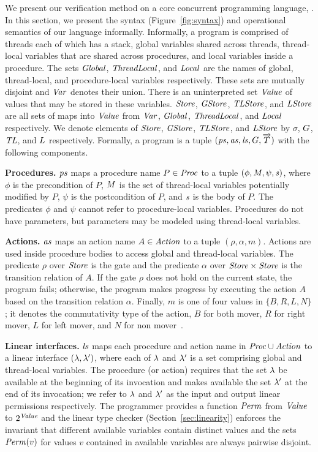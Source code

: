 We present our verification method on a core concurrent programming language, \civl.
In this section, we present the syntax (Figure~\ref{fig:syntax}) and operational semantics of our language informally.
Informally, a \civl program is comprised of threads each of which has a stack, global variables shared across threads, 
thread-local variables that are shared across procedures, and local variables inside a procedure.
The sets $\mathit{Global}$, $\mathit{ThreadLocal}$, and $\mathit{Local}$ are the names of global, thread-local, and procedure-local variables 
respectively.
These sets are mutually disjoint and $\mathit{Var}$ denotes their union.
There is an uninterpreted set $\mathit{Value}$ of values that may be stored in these variables.
$\mathit{Store}$, $\mathit{GStore}$, $\mathit{TLStore}$, and $\mathit{LStore}$ are all sets of maps into $\mathit{Value}$
from $\mathit{Var}$, $\mathit{Global}$, $\mathit{ThreadLocal}$, and $\mathit{Local}$ respectively.
We denote elements of $\mathit{Store}$, $\mathit{GStore}$, $\mathit{TLStore}$, and $\mathit{LStore}$
by $\sigma$, $G$, $\mathit{TL}$, and $L$ respectively.
Formally, a \civl program is a tuple $(\mathit{ps}, \mathit{as}, \mathit{ls}, G, \overrightarrow{T})$ with the following components.

\noindent
{\bf Procedures.}
$\mathit{ps}$ maps a procedure name $P \in \mathit{Proc}$ to a tuple $(\phi, M, \psi, \mathit{s})$, 
where $\phi$ is the precondition of $P$, $M$ is the set of thread-local variables potentially modified by $P$, 
$\psi$ is the postcondition of $P$, and $\mathit{s}$ is the body of $P$.
The predicates $\phi$ and $\psi$ cannot refer to procedure-local variables.
Procedures do not have parameters, but parameters may be modeled using thread-local variables.

\noindent
{\bf Actions.}
$\mathit{as}$ maps an action name $A \in \mathit{Action}$ to a tuple $(\rho,\alpha,m)$.
Actions are used inside procedure bodies to access global and thread-local variables.
The predicate $\rho$ over $\mathit{Store}$ is the gate and the predicate $\alpha$ over $\mathit{Store} \times \mathit{Store}$ 
is the transition relation of $A$.
If the gate $\rho$ does not hold on the current state, the program fails;
otherwise, the program makes progress by executing the action $A$ based on the transition relation $\alpha$.
Finally, $m$ is one of four values in $\{B,R,L,N\}$;
it denotes the commutativity type of the action, $B$ for both mover, $R$ for right mover, $L$ for left mover, 
and $N$ for non mover~\cite{FlanaganFLQ08}. 

\noindent
{\bf Linear interfaces.}
$\mathit{ls}$ maps each procedure and action name in $\mathit{Proc} \cup \mathit{Action}$ to a linear interface 
$(\lambda,\lambda')$, where each of $\lambda$ and $\lambda'$ is a set comprising global and thread-local variables.
The procedure (or action) requires that the set $\lambda$ be available at the beginning of its invocation 
and makes available the set $\lambda'$ at the end of its invocation; 
we refer to $\lambda$ and $\lambda'$ as the input and output linear permissions respectively.
The programmer provides a function $\mathit{Perm}$ from $\mathit{Value}$ to $2^{\mathit{Value}}$
and the linear type checker (Section~\ref{sec:linearity}) enforces the invariant that 
different available variables contain distinct values and 
the sets $\mathit{Perm}(v)$ for values $v$ contained in available variables are always pairwise disjoint.

